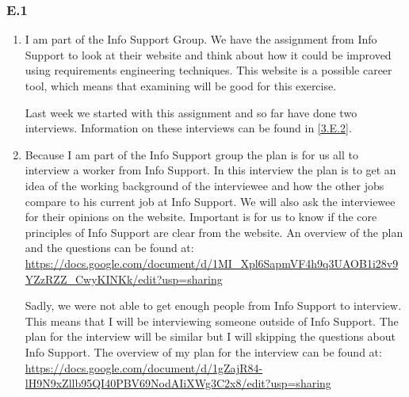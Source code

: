 \documentclass[]{article}
\begin{document}
\subsubsection*{E.1} 
\begin{enumerate}[a]
    \item I am part of the Info Support Group. We have the assignment from Info 
    Support to look at their website and think about how it could be improved 
    using requirements engineering techniques. This website is a possible career
    tool, which means that examining will be good for this exercise. 

    Last week we started with this assignment and so far have done two interviews.
    Information on these interviews can be found in \autoref{3.E.2}.  
    \item Because I am part of the Info Support group the plan is for us all to 
    interview a worker from Info Support. In this interview the plan is to get an 
    idea of the working background of the interviewee and how the other jobs 
    compare to his current job at Info Support. We will also ask the interviewee 
    for their opinions on the website. Important is for us to know if the core 
    principles of Info Support are clear from the website. An overview of the 
    plan and the questions can be found at: \url{https://docs.google.com/document/d/1MI_Xpl6SapmVF4h9q3UAOB1i28v9YZzRZZ_CwyKINKk/edit?usp=sharing}

    Sadly, we were not able to get enough people from Info Support to interview. 
    This means that I will be interviewing someone outside of Info Support. The 
    plan for the interview will be similar but I will skipping the questions 
    about Info Support. The overview of my plan for the interview can be found 
    at: \url{https://docs.google.com/document/d/1gZajR84-lH9N9xZllb95QI40PBV69NodAIiXWg3C2x8/edit?usp=sharing}
\end{enumerate}
\end{document}
